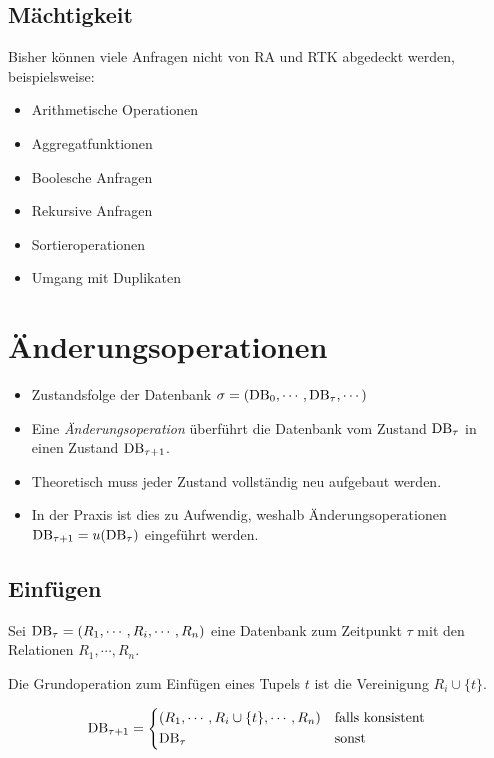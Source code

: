         \subsection{Mächtigkeit} %
        	Bisher können viele Anfragen nicht von RA und RTK abgedeckt werden, beispielsweise:
        	\begin{itemize}
        		\item Arithmetische Operationen
        		\item Aggregatfunktionen
        		\item Boolesche Anfragen
        		\item Rekursive Anfragen
        		\item Sortieroperationen
        		\item Umgang mit Duplikaten
        	\end{itemize}

    \section{Änderungsoperationen} %
        \begin{itemize}
        	\item Zustandsfolge der Datenbank \( \sigma = (\operatorname{DB}_0, \cdots, \operatorname{DB}_\tau, \cdots) \)
        	\item Eine \textit{Änderungsoperation} überführt die Datenbank vom Zustand \( \operatorname{DB}_\tau \) in einen Zustand \( \operatorname{DB}_{\tau + 1} \).
        	\item Theoretisch muss jeder Zustand vollständig neu aufgebaut werden.
        	\item In der Praxis ist dies zu Aufwendig, weshalb Änderungsoperationen \( \operatorname{DB}_{\tau+1} = u(\operatorname{DB}_\tau) \) eingeführt werden.
        \end{itemize}

        \subsection{Einfügen} %
            Sei \( \operatorname{DB}_\tau = (R_1, \cdots, R_i, \cdots, R_n) \) eine Datenbank zum Zeitpunkt \(\tau\) mit den Relationen \( R_1, \cdots, R_n \).
            
            Die Grundoperation zum Einfügen eines Tupels \( t \) ist die Vereinigung \( R_i \cup \{t\} \).
            
            \begin{equation*}
                \DB_{\tau + 1} =
                	\begin{cases*}
	                	(R_1, \cdots, R_i \cup \{t\}, \cdots, R_n) & \text{falls konsistent} \\
	                	\DB_\tau                                   & \text{sonst}
                	\end{cases*}
            \end{equation*}

